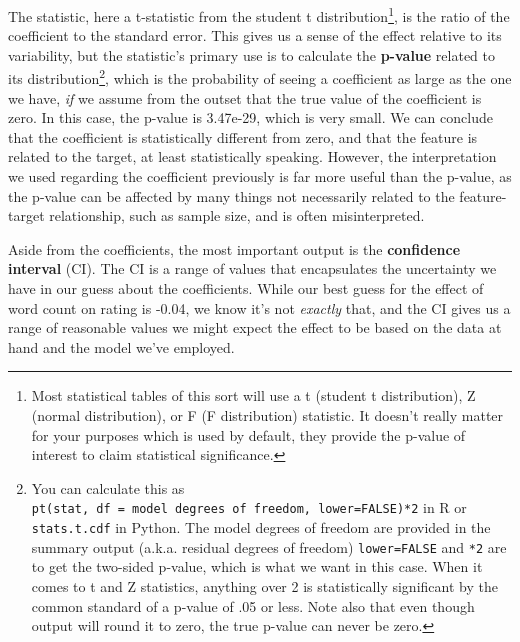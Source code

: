 \documentclass[
  letterpaper,
]{krantz}
\begin{document}
The statistic, here a t-statistic from the student t
distribution\footnote{Most statistical tables of this sort will use a t
  (student t distribution), Z (normal distribution), or F (F
  distribution) statistic. It doesn't really matter for your purposes
  which is used by default, they provide the p-value of interest to
  claim statistical significance.}, is the ratio of the coefficient to
the standard error. This gives us a sense of the effect relative to its
variability, but the statistic's primary use is to calculate the
\textbf{p-value} related to its distribution\footnote{You can calculate
  this as
  \texttt{pt(stat,\ df\ =\ model\ degrees\ of\ freedom,\ lower=FALSE)*2}
  in R or \texttt{stats.t.cdf} in Python. The model degrees of freedom
  are provided in the summary output (a.k.a. residual degrees of
  freedom) \texttt{lower=FALSE} and \texttt{*2} are to get the two-sided
  p-value, which is what we want in this case. When it comes to t and Z
  statistics, anything over 2 is statistically significant by the common
  standard of a p-value of .05 or less. Note also that even though
  output will round it to zero, the true p-value can never be zero.},
which is the probability of seeing a coefficient as large as the one we
have, \emph{if} we assume from the outset that the true value of the
coefficient is zero. In this case, the p-value is 3.47e-29, which is
very small. We can conclude that the coefficient is statistically
different from zero, and that the feature is related to the target, at
least statistically speaking. However, the interpretation we used
regarding the coefficient previously is far more useful than the
p-value, as the p-value can be affected by many things not necessarily
related to the feature-target relationship, such as sample size, and is
often misinterpreted.

Aside from the coefficients, the most important output is the
\textbf{confidence interval} (CI). The CI is a range of values that
encapsulates the uncertainty we have in our guess about the
coefficients. While our best guess for the effect of word count on
rating is -0.04, we know it's not \emph{exactly} that, and the CI gives
us a range of reasonable values we might expect the effect to be based
on the data at hand and the model we've employed.
\end{document}
